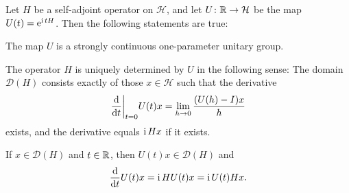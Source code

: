 \documentclass[article, a4paper, 11pt, oneside]{memoir}
\numberwithin{equation}{chapter}
\newcommand{\calH}{\mathcal{H}}
\newcommand{\dom}{\mathcal{D}}
\theoremstyle{myexample}
\theoremstyle{myexample}
\theoremstyle{myexamplebreak}
\theoremstyle{myexamplebreak}
\theoremstyle{nonumberplain}
\theoremstyle{MyNonumberplain}
\begin{document}
\begin{proposition}
    Let $H$ be a self-adjoint operator on $\calH$, and let $U \colon \setR \to \calH$ be the map $U(t) = \operatorname{\mathrm{e}}^{\operatorname{i} tH}$. Then the following statements are true:
    
    \begin{enumprop}
        \item The map $U$ is a strongly continuous one-parameter unitary group. \label{enum:exp_unitary_group}
        
        \item\label{enum:unitary_derivative_zero} The operator $H$ is uniquely determined by $U$ in the following sense: The domain $\dom(H)$ consists exactly of those $x \in \calH$ such that the derivative
        \begin{equation}
            \label{eq:unitary_derivative_zero}
            \frac{\mathop{}\!\mathrm{d}}{\mathop{}\!\mathrm{d} t} \bigg\rvert_{t = 0} U(t)x
                = \lim_{h \to 0} \frac{(U(h) - I)x}{h}
        \end{equation}
        exists, and the derivative equals $\operatorname{i} Hx$ if it exists.
        
        \item\label{enum:unitary_derivative_all} If $x \in \dom(H)$ and $t \in \mathbb{R}$, then $U(t)x \in \dom(H)$ and
        \begin{equation}
            \label{eq:unitary_derivative_all}
            \frac{\mathop{}\!\mathrm{d}}{\mathop{}\!\mathrm{d} t} U(t)x = \operatorname{i} H U(t)x = \operatorname{i} U(t) Hx.
        \end{equation}
    \end{enumprop}
\end{proposition}
\end{document}
